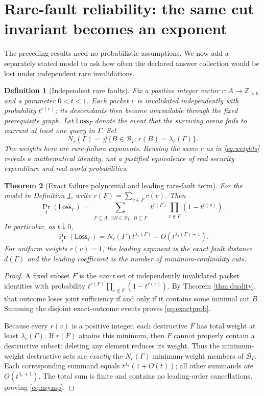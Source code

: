 \documentclass[11pt,letterpaper]{article}
\newtheorem{theorem}{Theorem}[section]
\newtheorem{definition}[theorem]{Definition}
\newcommand{\calB}{\mathcal B}
\newcommand{\Gam}{\Gamma}
\begin{document}
\section{Rare-fault reliability: the same cut invariant becomes an exponent}\label{gl-first-W3-s6}
The preceding results need no probabilistic assumptions. We now add a separately stated model to ask how often the declared answer collection would be lost under independent rare invalidations.

\begin{definition}[Independent rare faults]\label{def:prob}
Fix a positive integer vector $r:A\to\mathbb Z_{>0}$ and a parameter $0<t<1$. Each packet $v$ is invalidated independently with probability $t^{r(v)}$; its descendants then become unavailable through the fixed prerequisite graph. Let $\mathsf{Loss}_\Gam$ denote the event that the surviving arena fails to warrant at least one query in $\Gam$. Set
\[
N_r(\Gam)=\#\{B\in\calB_\Gam:r(B)=\lambda_r(\Gam)\}.
\]
The weights here are \emph{rare-failure exponents}. Reusing the same $r$ as in \eqref{eq:weights} reveals a mathematical identity, not a justified equivalence of real security expenditure and real-world probabilities.
\end{definition}

\begin{theorem}[Exact failure polynomial and leading rare-fault term]\label{thm:reliability}
For the model in Definition \ref{def:prob}, write $r(F)=\sum_{v\in F}r(v)$. Then
\[
\Pr_t(\mathsf{Loss}_\Gam)
=\sum_{\substack{F\subseteq A:\ \exists B\in\calB_\Gam,\ B\subseteq F}}
 t^{r(F)}\prod_{v\notin F}(1-t^{r(v)}).
\tag{13}\label{eq:exactprob}
\]
In particular, as $t\downarrow0$,
\[
\boxed{\displaystyle
\Pr_t(\mathsf{Loss}_\Gam)
=N_r(\Gam)t^{\lambda_r(\Gam)}
+O\!\left(t^{\lambda_r(\Gam)+1}\right).}
\tag{14}\label{eq:asymp}
\]
For uniform weights $r(v)=1$, the leading exponent is the exact fault distance $d(\Gam)$ and the leading coefficient is the number of minimum-cardinality cuts.
\end{theorem}
\begin{proof}
A fixed subset $F$ is the \emph{exact} set of independently invalidated packet identities with probability $t^{r(F)}\prod_{v\notin F}(1-t^{r(v)})$. By Theorem \ref{thm:duality}, that outcome loses joint sufficiency if and only if it contains some minimal cut $B$. Summing the disjoint exact-outcome events proves \eqref{eq:exactprob}.

Because every $r(v)$ is a positive integer, each destructive $F$ has total weight at least $\lambda_r(\Gam)$. If $r(F)$ attains this minimum, then $F$ cannot properly contain a destructive subset: deleting any element reduces its weight. Thus the minimum-weight destructive sets are \emph{exactly} the $N_r(\Gam)$ minimum-weight members of $\calB_\Gam$. Each corresponding summand equals $t^{\lambda_r}(1+O(t))$; all other summands are $O(t^{\lambda_r+1})$. The total sum is finite and contains no leading-order cancellations, proving \eqref{eq:asymp}.
\end{proof}
\end{document}
